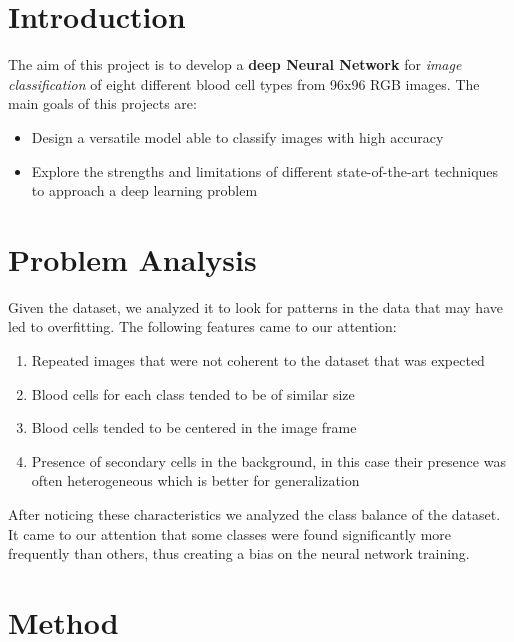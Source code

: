 \documentclass[11pt]{article}
\begin{document}
    \begin{multicols}{2}        
        \section{Introduction}
        The aim of this project is to develop a \textbf{deep Neural Network} for \textit{image classification} of eight different blood cell types from 96x96 RGB images.
        The main goals of this projects are:
        \begin{itemize}
            \item Design a versatile model able to classify images with high accuracy
            \item Explore the strengths and limitations of different state-of-the-art techniques to approach a deep learning problem
        \end{itemize}
        
        \section{Problem Analysis}
        Given the dataset, we analyzed it to look for patterns in the data that may have led to overfitting.
        The following features came to our attention:
        \begin{enumerate}
            \item Repeated images that were not coherent to the dataset that was expected
            \item Blood cells for each class tended to be of similar size
            \item Blood cells tended to be centered in the image frame
            \item Presence of secondary cells in the background, in this case their presence was often heterogeneous which is better for generalization 
        \end{enumerate}
        After noticing these characteristics we analyzed the class balance of the dataset. It came to our attention that some classes were found significantly more frequently than others, thus creating a bias on the neural network training.
        \section{Method}
        

\end{multicols}
\end{document}
